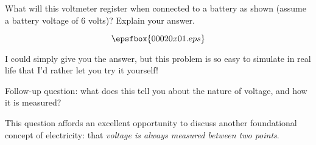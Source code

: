 

What will this voltmeter register when connected to a battery as shown (assume a battery voltage of 6 volts)?  Explain your answer.

$$\epsfbox{00020x01.eps}$$







I could simply give you the answer, but this problem is so easy to simulate in real life that I'd rather let you try it yourself!

\vskip 10pt

Follow-up question: what does this tell you about the nature of voltage, and how it is measured?







This question affords an excellent opportunity to discuss another foundational concept of electricity: that {\it voltage is always measured between two points}.




